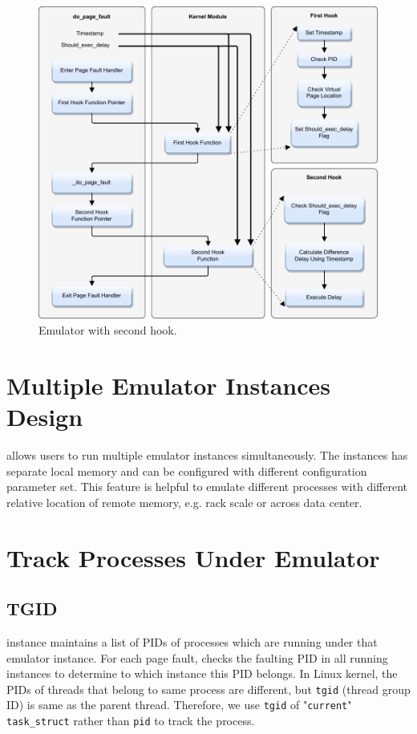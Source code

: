 \begin{figure}[tbp]
  \centering
    \includegraphics[width=1.0\textwidth]{implementation/second_hook.pdf}
    \caption[Second Hook Function]{Emulator with second hook.}
    \label{fig:hook_2} 
\end{figure}

\section{Multiple Emulator Instances Design}
{\dime} allows users to run multiple emulator instances simultaneously. The instances has separate local memory and can be configured with different configuration parameter set. This feature is helpful to emulate different processes with different relative location of remote memory, e.g. rack scale or across data center.

\section{Track Processes Under Emulator}
\subsection{TGID}
{\dime} instance maintains a list of PIDs of processes which are running under that emulator instance. For each page fault, {\dime} checks the faulting PID in all running {\dime} instances to determine to which instance this PID belongs. In Linux kernel, the PIDs of threads that belong to same process are different, but \verb|tgid| (thread group ID) is same as the parent thread. Therefore, we use \verb|tgid| of "\verb|current|" \verb|task_struct| rather than \verb|pid| to track the process.


